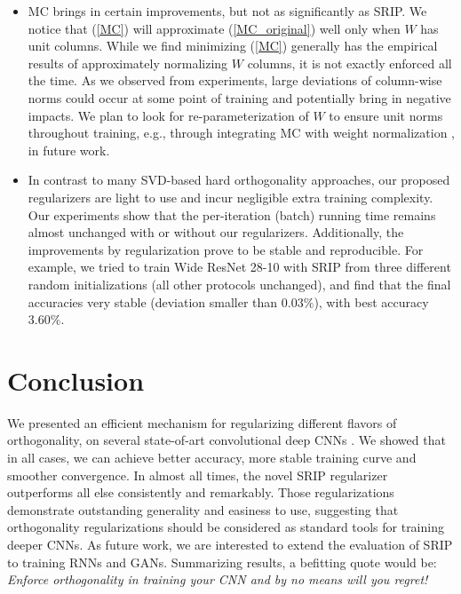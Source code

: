 \documentclass{article}
\begin{document}
\begin{itemize}
    \item MC brings in certain improvements, but not as significantly as SRIP. We notice that  (\ref{MC}) will approximate (\ref{MC_original}) well only when $W$ has unit columns. While we find minimizing (\ref{MC}) generally has the empirical results of approximately normalizing $W$ columns, it is not exactly enforced all the time. As we observed from experiments, large deviations of column-wise norms could occur at some point of training and potentially bring in negative impacts. We plan to look for re-parameterization of $W$ to ensure unit norms throughout training, e.g., through integrating MC with weight normalization \cite{salimans2016weight}, in future work.

    \item In contrast to many SVD-based hard orthogonality approaches, our proposed regularizers are light to use and incur negligible extra training complexity. Our experiments show that the per-iteration (batch) running time remains almost unchanged with or without our regularizers. Additionally, the improvements by regularization prove to be stable and reproducible. For example, we tried to train Wide ResNet 28-10 with SRIP from three different random initializations (all other protocols unchanged), and find that the final accuracies very stable (deviation smaller than $0.03\%$), with best accuracy $3.60\%$.




    \vspace{-0.5em}
\end{itemize}

\section{Conclusion}
We presented an efficient mechanism for regularizing different flavors of orthogonality, on several state-of-art convolutional deep CNNs \cite{zagoruyko2016wide,he2016deep,xie2017aggregated}. We showed that in all cases, we can achieve better accuracy, more stable training curve and smoother convergence. In almost all times, the novel SRIP regularizer outperforms all else consistently and remarkably. Those regularizations demonstrate outstanding generality and easiness to use, suggesting that orthogonality regularizations should be considered as standard tools for training deeper CNNs. As future work, we are interested to extend the evaluation of SRIP to training RNNs and GANs. Summarizing results, a befitting quote would be: \textit{Enforce orthogonality in training your CNN and by no means will you regret!}




\end{document}
